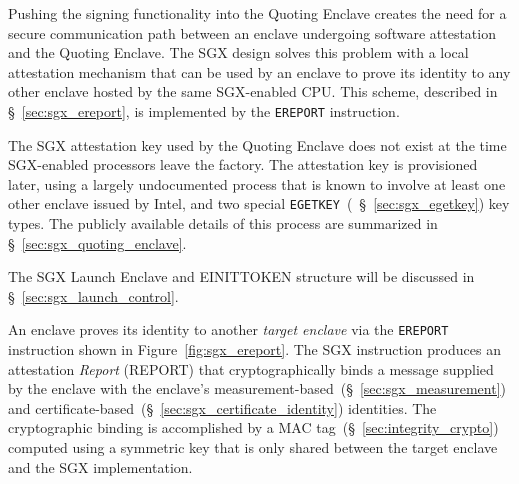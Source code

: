 Pushing the signing functionality into the Quoting Enclave creates the need for
a secure communication path between an enclave undergoing software attestation
and the Quoting Enclave. The SGX design solves this problem with a local
attestation mechanism that can be used by an enclave to prove its identity to
any other enclave hosted by the same SGX-enabled CPU. This scheme, described in
\S~\ref{sec:sgx_ereport}, is implemented by the \texttt{EREPORT} instruction.


The SGX attestation key used by the Quoting Enclave does not exist at the time
SGX-enabled processors leave the factory. The attestation key is provisioned
later, using a largely undocumented process that is known to involve at least
one other enclave issued by Intel, and two special
\texttt{EGETKEY}~(~\S~\ref{sec:sgx_egetkey}) key types. The publicly available
details of this process are summarized in \S~\ref{sec:sgx_quoting_enclave}.

The SGX Launch Enclave and EINITTOKEN structure will be discussed in
\S~\ref{sec:sgx_launch_control}.


\label{sec:sgx_ereport}


An enclave proves its identity to another \textit{target enclave} via the
\texttt{EREPORT} instruction shown in Figure~\ref{fig:sgx_ereport}. The SGX
instruction produces an attestation \textit{Report} (REPORT) that
cryptographically binds a message supplied by the enclave with the enclave's
measurement-based~(\S~\ref{sec:sgx_measurement}) and
certificate-based~(\S~\ref{sec:sgx_certificate_identity}) identities. The
cryptographic binding is accomplished by a MAC
tag~(\S~\ref{sec:integrity_crypto}) computed using a symmetric key that is only
shared between the target enclave and the SGX implementation.


